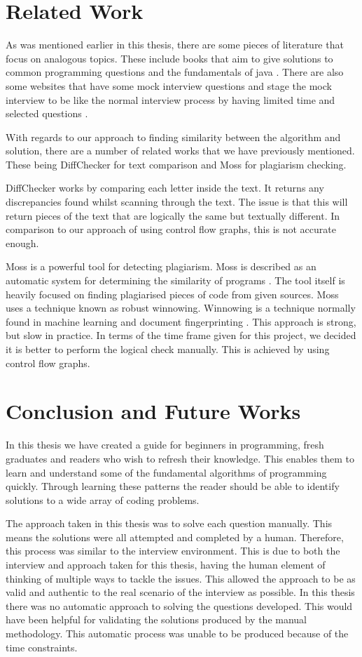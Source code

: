 \documentclass[conference]{IEEEtran}
\begin{document}
\section{Related Work}
As was mentioned earlier in this thesis, there are some pieces of literature that focus on analogous topics. These include books that aim to give solutions to common programming questions \cite{mcdowell2015cracking} and the fundamentals of java \cite{markham2014java}\cite{aziz2012elements}. There are also some websites that have some mock interview questions and stage the mock interview to be like the normal interview process by having limited time and selected questions \cite{pramp}.
\par With regards to our approach to finding similarity between the algorithm and solution, there are a number of related works that we have previously mentioned. These being DiffChecker for text comparison and Moss for plagiarism checking. 
\par DiffChecker works by comparing each letter inside the text. It returns any discrepancies found whilst scanning through the text. The issue is that this will return pieces of the text that are logically the same but textually different. In comparison to our approach of using control flow graphs, this is not accurate enough. 
\par Moss is a powerful tool for detecting plagiarism. Moss is described as an automatic system for determining the similarity of programs \cite{mosswebsite}. The tool itself is heavily focused on finding plagiarised pieces of code from given sources. Moss uses a technique known as robust winnowing. Winnowing is a technique normally found in machine learning and document fingerprinting \cite{Schleimer:2003:WLA:872757.872770}. This approach is strong, but slow in practice. In terms of the time frame given for this project, we decided it is better to perform the logical check manually. This is achieved by using control flow graphs.

\section{Conclusion and Future Works}
In this thesis we have created a guide for beginners in programming, fresh graduates and readers who wish to refresh their knowledge. This enables them to learn and understand some of the fundamental algorithms of programming quickly. Through learning these patterns the reader should be able to identify solutions to a wide array of coding problems. 
\par The approach taken in this thesis was to solve each question manually. This means the solutions were all attempted and completed by a human. Therefore, this process was similar to the interview environment. This is due to both the interview and approach taken for this thesis, having the human element of thinking of multiple ways to tackle the issues. This allowed the approach to be as valid and authentic to the real scenario of the interview as possible.
In this thesis there was no automatic approach to solving the questions developed. This would have been helpful for validating the solutions produced by the manual methodology. This automatic process was unable to be produced because of the time constraints. 
\end{document}
